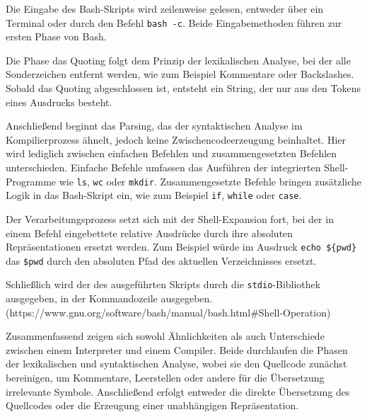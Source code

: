 Die Eingabe des Bash-Skripts wird zeilenweise gelesen, entweder über ein Terminal oder durch den Befehl \verb+bash -c+. Beide Eingabemethoden führen zur ersten Phase von Bash.

Die Phase das Quoting folgt dem Prinzip der lexikalischen Analyse, bei der alle Sonderzeichen entfernt werden, wie zum Beispiel Kommentare oder Backslashes. Sobald das Quoting abgeschlossen ist, entsteht ein String, der nur aus den Tokens eines Ausdrucks besteht.

Anschließend beginnt das Parsing, das der syntaktischen Analyse im Kompilierprozess ähnelt, jedoch keine Zwischencodeerzeugung beinhaltet. Hier wird lediglich zwischen einfachen Befehlen und zusammengesetzten Befehlen unterschieden. Einfache Befehle umfassen das Ausführen der integrierten Shell-Programme wie \verb+ls+, \verb+wc+ oder \verb+mkdir+. Zusammengesetzte Befehle bringen zusätzliche Logik in das Bash-Skript ein, wie zum Beispiel \verb+if+, \verb+while+ oder \verb+case+.

Der Verarbeitungsprozess setzt sich mit der Shell-Expansion fort, bei der in einem Befehl eingebettete relative Ausdrücke durch ihre absoluten Repräsentationen ersetzt werden. Zum Beispiel würde im Ausdruck \verb+echo ${pwd}+ das \verb+$pwd+ durch den absoluten Pfad des aktuellen Verzeichnisses ersetzt.

Schließlich wird der des ausgeführten Skripts durch die \verb+stdio+-Bibliothek ausgegeben, in der Kommandozeile ausgegeben.
(https://www.gnu.org/software/bash/manual/bash.html#Shell-Operation)


Zusammenfassend zeigen sich sowohl Ähnlichkeiten als auch Unterschiede zwischen einem Interpreter und einem Compiler. Beide durchlaufen die Phasen der lexikalischen und syntaktischen Analyse, wobei sie den Quellcode zunächst bereinigen, um Kommentare, Leerstellen oder andere für die Übersetzung irrelevante Symbole. Anschließend erfolgt entweder die direkte Übersetzung des Quellcodes oder die Erzeugung einer unabhängigen Repräsentation.


